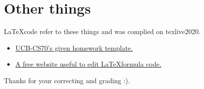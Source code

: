\documentclass[11pt]{article}  %
\begin{document}
\section*{Other things}

\LaTeX \space code refer to these things and was complied on texlive2020.
\begin{itemize}
    \item  \href{https://www.eecs70.org/assets/misc/homework_template.tex}{UCB-CS70's given homework template.} 
    \item  \href{https://www.latexlive.com}{A free website useful to edit \LaTeX \space formula code.}
\end{itemize}

Thanks for your correcting and grading :).
\end{document}
